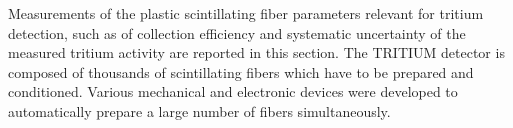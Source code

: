 Measurements of the plastic scintillating fiber parameters relevant for tritium detection, such as of collection efficiency and systematic uncertainty of the measured tritium activity are reported in this section. The TRITIUM detector is composed of thousands of scintillating fibers which have to be prepared and conditioned. Various mechanical and electronic devices were developed to automatically prepare a large number of fibers simultaneously.